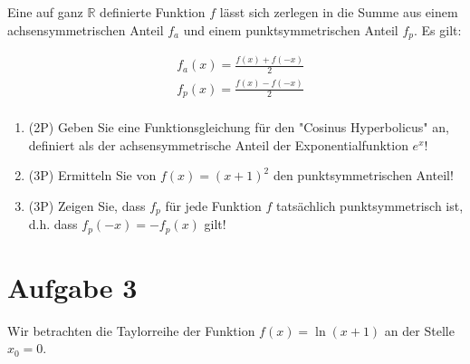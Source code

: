 \documentclass[12pt]{article}
\begin{document}
Eine auf ganz $\mathbb{R}$ definierte Funktion $f$ lässt sich zerlegen in die Summe aus einem achsensymmetrischen Anteil $f_a$ und einem punktsymmetrischen Anteil $f_p$. Es gilt:

\begin{align*}
&f_a(x) = \frac{f(x)+f(-x)}{2}\\
&f_p(x)= \frac{f(x)-f(-x)}{2}\\
\end{align*}

\begin{enumerate}[label=(\alph*)]

\item (2P) Geben Sie eine Funktionsgleichung für den "Cosinus Hyperbolicus" an, definiert als der achsensymmetrische Anteil der Exponentialfunktion $e^x$!

\bigskip
\bigskip
\bigskip
\bigskip
\bigskip
\bigskip
\bigskip
\bigskip

\item (3P) Ermitteln Sie von $f(x) = (x+1)^2$ den punktsymmetrischen Anteil!

\bigskip
\bigskip
\bigskip
\bigskip
\bigskip
\bigskip
\bigskip
\bigskip
\bigskip
\bigskip
\bigskip
\bigskip

\item (3P) Zeigen Sie, dass $f_p$ für jede Funktion $f$ tatsächlich punktsymmetrisch ist, d.h. dass $f_p(-x) = -f_p(x)$ gilt!


\end{enumerate}

\newpage
\section* {Aufgabe 3}

Wir betrachten die Taylorreihe der Funktion $f(x) = \ln(x+1)$ an der Stelle $x_0=0$.
\end{document}
